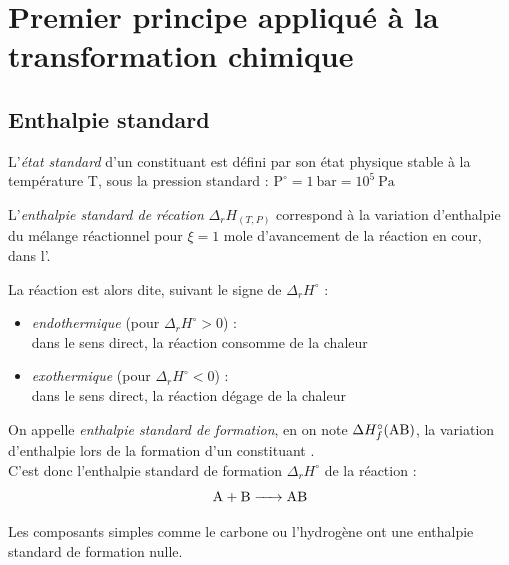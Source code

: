 \documentclass[11pt,a4paper,fleqn,pdftex]{report}
\begin{document}
\chapter{Premier principe appliqué à la transformation chimique} %
\label{cha:premier_principe_applique_la_transformation_chimique}
\section{Enthalpie standard} %
\label{sec:enthalpie_standard}
\begin{dfn} %
   L'\emph{état standard} d'un constituant est défini par son état physique stable à la température T, sous la pression standard : 
   $\mathrm{P}^\circ = 1~\si{\bar} = 10^5~\si{\pascal}$
\end{dfn}
\begin{dfn}
   L'\emph{enthalpie standard de récation} $\Delta_{r}H_{(T,P)}$ correspond à la variation d'enthalpie du mélange réactionnel pour $\xi = 1$ mole d'avancement de la réaction en cour, dans l'.\par
   La réaction est alors dite, suivant le signe de $\Delta_r H^\circ$ : 
   \begin{itemize}
     \item \emph{endothermique} (pour $\Delta_r H^\circ > 0$) : \\dans le sens direct, la réaction consomme de la chaleur
     \item \emph{exothermique} (pour $\Delta_r H^\circ < 0$) : \\dans le sens direct, la réaction dégage de la chaleur
   \end{itemize}
\end{dfn}
\begin{dfn}
   On appelle \emph{enthalpie standard de formation}, en on note $\Delta H^\circ_f (\ce{AB})$, la variation d'enthalpie lors de la formation d'un constituant . \\
   C'est donc l'enthalpie standard de formation $\Delta_rH^\circ$ de la réaction : 
   \[
     \ce{
     A + B -> AB
     }
   \]
\end{dfn}
 Les composants simples comme le carbone  ou l'hydrogène  ont une enthalpie standard de formation nulle. 
\end{document}
